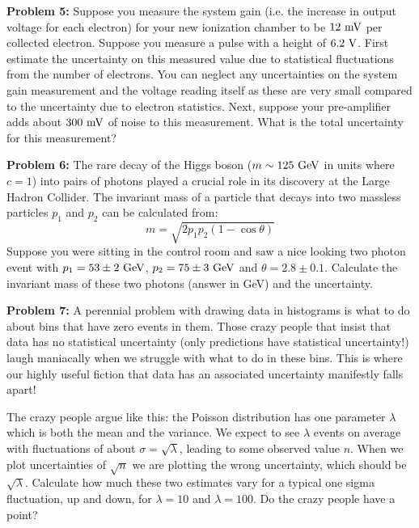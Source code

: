 \documentclass[12pt,oneside]{book}
\begin{document}
\noindent
{\bf Problem 5:}  Suppose you measure the system gain (i.e. the increase in output voltage for each electron) for your new ionization chamber to be $12~\rm mV$ per collected electron.  Suppose you measure a pulse with a height of $6.2~\rm V$.  First estimate the uncertainty on this measured value due to statistical fluctuations from the number of electrons.   You can neglect any uncertainties on the system gain measurement and the voltage reading itself as these are very small compared to the uncertainty due to electron statistics.  Next, suppose your pre-amplifier adds about $300~\rm mV$ of noise to this measurement.  What is the total uncertainty for this measurement? \\ \vskip 0.25cm

\noindent
{\bf Problem 6:}  The rare decay of the Higgs boson ($m \sim125~\rm GeV$ in units where $c=1$) into pairs of photons played a crucial role in its discovery at the Large Hadron Collider.  The invariant mass of a particle that decays into two massless particles $p_1$ and $p_2$ can be calculated from:
\begin{displaymath}
m = \sqrt{2  p_1 p_2 (1 - \cos\theta)}
\end{displaymath}
Suppose you were sitting in the control room and saw a nice looking two photon event with 
$p_1=53 \pm 2~\rm GeV$, $p_2=75 \pm 3~\rm GeV$ and $\theta = 2.8 \pm 0.1$.   Calculate the invariant mass of these two photons (answer in GeV) and the uncertainty. \\ \vskip 0.25cm

\noindent
{\bf Problem 7:}  A perennial problem with drawing data in histograms is what to do about bins that have zero events in them.  Those crazy people that insist that data has no statistical uncertainty (only predictions have statistical uncertainty!) laugh maniacally when we struggle with what to do in these bins.  This is where our highly useful fiction that data has an associated uncertainty manifestly falls apart! 

The crazy people argue like this: the Poisson distribution has one parameter $\lambda$ which is both the mean and the variance.  We expect to see $\lambda$ events on average with fluctuations of about $\sigma = \sqrt{\lambda}$, leading to some observed value $n$.  When we plot uncertainties of $\sqrt{n}$ we are plotting the wrong uncertainty, which should be $\sqrt{\lambda}$.  Calculate how much these two estimates vary for a typical one sigma fluctuation, up and down, for $\lambda=10$ and $\lambda=100$.  Do the crazy people have a point? \\ \vskip 0.25cm
\end{document}
